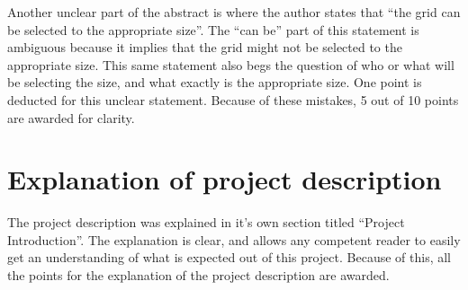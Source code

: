 Another unclear part of the abstract is where the author states
that ``the grid can be selected to the appropriate size''.  The ``can be'' part of this statement
is ambiguous because it implies that the grid might not be selected to the appropriate size.
This same statement also begs the question of who or what will be selecting the size, and what
exactly is the appropriate size.  One point is deducted for this unclear statement.  Because of
these mistakes, 5 out of 10 points are awarded for clarity.

\section{Explanation of project description}
The project description was explained in it's own section titled ``Project Introduction''.  The explanation
is clear, and allows any competent reader to easily get an understanding of what is expected out of this
project.  Because of this, all the points for the explanation of the project description are awarded.

